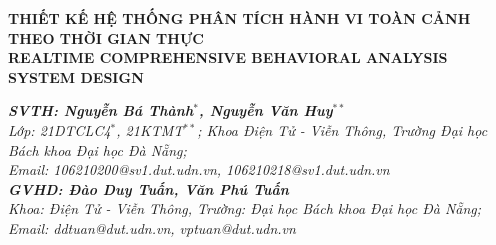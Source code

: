 \documentclass[a4paper, twoside, 10pt]{article}
\begin{document}
\setlength{\multicolsep}{5pt}
\fontsize{12.5}{13}\selectfont
\thispagestyle{firstpage}

\begin{center}
    {\fontsize{12.3}{15}\selectfont \textcolor{myblue}{\textbf{THIẾT KẾ HỆ THỐNG PHÂN TÍCH HÀNH VI TOÀN CẢNH THEO THỜI GIAN THỰC}}} \\
    \vspace{2pt}
    {\fontsize{12.3}{15}\selectfont \textcolor{myred}{\textbf{REALTIME COMPREHENSIVE BEHAVIORAL ANALYSIS SYSTEM DESIGN}}} \\

    \vspace{10pt}

    {\fontsize{11}{13}\selectfont
        \textit{\textbf{SVTH: Nguyễn Bá Thành$^*$, Nguyễn Văn Huy$^{**}$}} \\
        \textit{Lớp: 21DTCLC4$^*$, 21KTMT$^{**}$; Khoa Điện Tử - Viễn Thông, Trường Đại học Bách khoa Đại học Đà Nẵng;} \\
        \textit{Email: 106210200@sv1.dut.udn.vn, 106210218@sv1.dut.udn.vn} \\
        \vspace{5pt}
        \textit{\textbf{GVHD: Đào Duy Tuấn, Văn Phú Tuấn}} \\
        \textit{Khoa: Điện Tử - Viễn Thông, Trường: Đại học Bách khoa Đại học Đà Nẵng;}\\
        \textit{Email: ddtuan@dut.udn.vn, vptuan@dut.udn.vn}
    }
\end{center}
\end{document}
